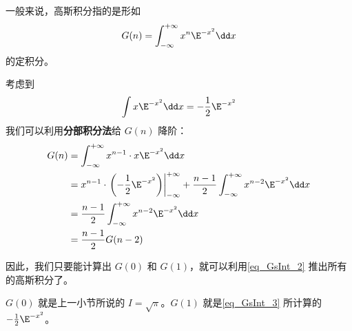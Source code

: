 一般来说，高斯积分指的是形如
\begin{equation}
G(n)=\int_{-\infty}^{+\infty} x^n\E^{-x^2}\dd x
\end{equation}
的定积分。

考虑到
\begin{equation}\label{eq_GsInt_3}
\int x\E^{-x^2}\dd x=-\frac{1}{2}\E^{-x^2}
\end{equation}
我们可以利用\textbf{分部积分法}给 $G(n)$ 降阶：
\begin{equation}\label{eq_GsInt_2}
\begin{aligned}
G(n)&=\int_{-\infty}^{+\infty} x^{n-1}\cdot x\E^{-x^2}\dd x\\
&=x^{n-1}\cdot\left.\left(-\frac{1}{2}\E^{-x^2}\right)\right|_{-\infty}^{+\infty}+\frac{n-1}{2}\int_{-\infty}^{+\infty} x^{n-2}\E^{-x^2}\dd x\\
&=\frac{n-1}{2}\int_{-\infty}^{+\infty} x^{n-2}\E^{-x^2}\dd x\\
&=\frac{n-1}{2}G(n-2)
\end{aligned}
\end{equation}

因此，我们只要能计算出 $G(0)$ 和 $G(1)$，就可以利用\autoref{eq_GsInt_2} 推出所有的高斯积分了。

$G(0)$ 就是上一小节所说的 $I=\sqrt{\pi}$。$G(1)$ 就是\autoref{eq_GsInt_3} 所计算的 $-\frac{1}{2}\E^{-x^2}$。










